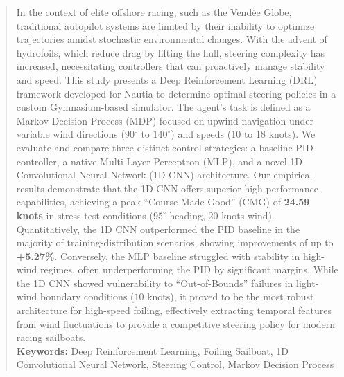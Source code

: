 \documentclass[11pt, a4paper]{article}
\begin{document}
\thispagestyle{plain} 
\begin{abstract}
    \noindent  \large In the context of elite offshore racing, such as the Vendée Globe, traditional autopilot systems are limited by their inability to optimize trajectories amidst stochastic environmental changes. With the advent of hydrofoils, which reduce drag by lifting the hull, steering complexity has increased, necessitating controllers that can proactively manage stability and speed. This study presents a Deep Reinforcement Learning (DRL) framework developed for Nautia to determine optimal steering policies in a custom Gymnasium-based simulator. The agent's task is defined as a Markov Decision Process (MDP) focused on upwind navigation under variable wind directions ($90^\circ$ to $140^\circ$) and speeds (10 to 18 knots). We evaluate and compare three distinct control strategies: a baseline PID controller, a native Multi-Layer Perceptron (MLP), and a novel 1D Convolutional Neural Network (1D CNN) architecture. Our empirical results demonstrate that the 1D CNN offers superior high-performance capabilities, achieving a peak \enquote{Course Made Good} (CMG) of \textbf{24.59 knots} in stress-test conditions ($95^\circ$ heading, 20 knots wind). Quantitatively, the 1D CNN outperformed the PID baseline in the majority of training-distribution scenarios, showing improvements of up to \textbf{+5.27\%}. Conversely, the MLP baseline struggled with stability in high-wind regimes, often underperforming the PID by significant margins. While the 1D CNN showed vulnerability to \enquote{Out-of-Bounds} failures in light-wind boundary conditions ($10$ knots), it proved to be the most robust architecture for high-speed foiling, effectively extracting temporal features from wind fluctuations to provide a competitive steering policy for modern racing sailboats.
    \vspace{0.5cm}
    \\
    \noindent\textbf{Keywords:} Deep Reinforcement Learning, Foiling Sailboat, 1D Convolutional Neural Network, Steering Control, Markov Decision Process


    
\end{abstract}

\newpage

\tableofcontents
\newpage

\setcounter{page}{1}







       
%

%
%

\appendix

\end{document}
